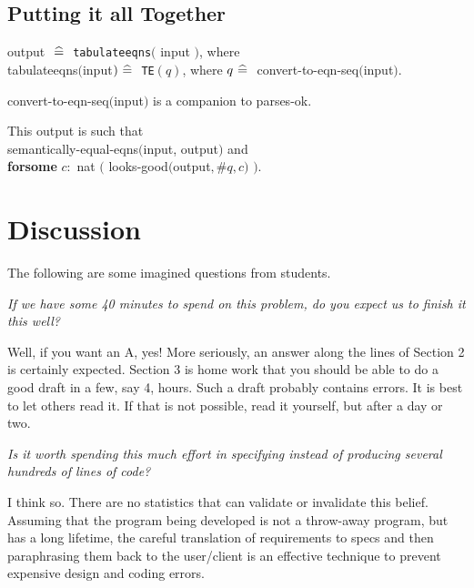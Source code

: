 \documentclass[12pt]{article}
\def\zdef{\bf\ \widehat{=}\ }
\def\forsome{{\bf forsome }}
\begin{document}
\subsection{Putting it all Together}

output $\zdef$ {\tt tabulateeqns}$($ input $)$, where\\
tabulateeqns$($input$) \zdef $ {\tt TE}$(q)$, where $q \zdef$
convert-to-eqn-seq$($input$)$.

{\small convert-to-eqn-seq$($input$)$ is a companion to
parses-ok.}

\noindent
This output is such that\\
semantically-equal-eqns$($input, output$)$ and\\
\forsome $c:$ nat $($ looks-good$($output$, \#q, c)$ $)$.

\section{Discussion}

The following are some imagined questions from students.

{\sl If we have some 40 minutes to spend on this problem, do you
expect us to finish it this well?}

{\small
Well, if you want an A, yes! More seriously, an answer along the lines
of Section 2 is certainly expected.  Section 3 is home work that you
should be able to do a good draft in a few, say 4, hours.  Such a
draft probably contains errors.  It is best to let others read it.  If
that is not possible, read it yourself, but after a day or two.}

{\sl Is it worth spending this much effort in specifying instead of
producing several hundreds of lines of code?}

{\small I think so.  There are no statistics that can validate or
invalidate this belief.  Assuming that the program being developed is
not a throw-away program, but has a long lifetime, the careful
translation of requirements to specs and then paraphrasing them back
to the user/client is an effective technique to prevent expensive
design and coding errors.}


\end{document}

